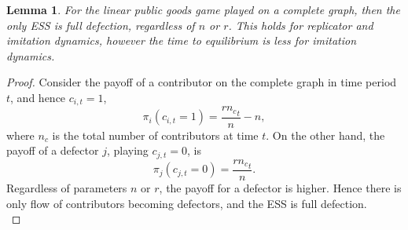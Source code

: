 \newtheorem{lemma_connected}[theorem]{Lemma} 
\begin{lemma_connected}
For the linear public goods game played on a complete graph, then the only ESS is full defection, regardless of $n$ or $r$. This holds for replicator and imitation dynamics, however the time to equilibrium is less for imitation dynamics.  \end{lemma_connected} \label{connected}
\begin{proof}
Consider the payoff of a contributor on the complete graph in time period $t$, and hence $c_{i,t} = 1$, $$\pi_i(c_{i,t} = 1) = \frac{r {n_c}_t}{n} - n,  $$ where $n_c$ is the total number of contributors at time $t$. On the other hand, the payoff of a defector $j$, playing $c_{j,t} = 0$, is $$\pi_j(c_{j,t} = 0) = \frac{r {n_c}_t}{n}. $$ Regardless of parameters $n$ or $r$, the payoff for a defector is higher. Hence there is only flow of contributors becoming defectors, and the ESS is full defection. \\


\end{proof}
